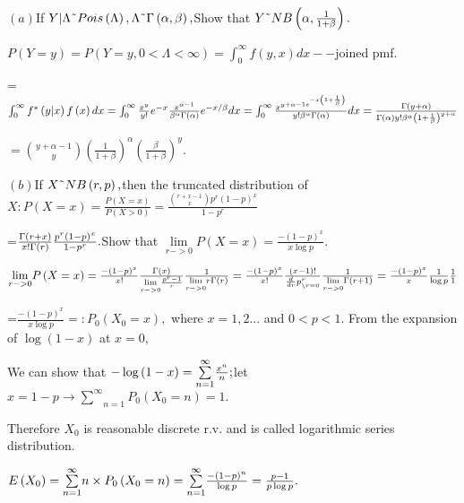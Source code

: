 \documentclass{article}
\begin{document}
$\left( a\right) $If $Y|\Lambda \symbol{126}Pois\left( \Lambda \right)
,\Lambda \symbol{126}\Gamma \left( \alpha ,\beta \right) ,$Show that $Y%
\symbol{126}NB\left( \alpha ,\frac{1}{1+\beta }\right) .$

$P\left( Y=y\right) =P\left( Y=y,0<\Lambda <\infty \right) =\int_{0}^{\infty
}f\left( y,x\right) dx--$joined pmf.

=$\int_{0}^{\infty }f^{\ast }\left( y|x\right) f\left( x\right)
dx=\int_{0}^{\infty }\frac{x^{y}}{y!}e^{-x}\frac{x^{\alpha -1}}{\beta
^{\alpha }\Gamma \left( \alpha \right) }e^{-x/\beta }dx=\int_{0}^{\infty }%
\frac{x^{y+\alpha -1e^{-x\left( 1+\frac{1}{\beta }\right) }}}{y!\beta
^{\alpha }\Gamma \left( \alpha \right) }dx=\frac{\Gamma \left( y+\alpha
\right) }{\Gamma \left( \alpha \right) y!\beta ^{\alpha }\left( 1+\frac{1}{%
\beta }\right) ^{y+\alpha }}$

$=\binom{y+\alpha -1}{y}\left( \frac{1}{1+\beta }\right) ^{\alpha }\left( 
\frac{\beta }{1+\beta }\right) ^{y}.$

\bigskip $\left( b\right) $If $X\symbol{126}NB\left( r,p\right) ,$then the
truncated distribution of $X:P(X=x)=\frac{P(X=x)}{P(X>0)}=\frac{\binom{r+x-1%
}{x}p^{r}\left( 1-p\right) ^{x}}{1-p^{r}}$

=$\frac{\Gamma \left( r+x\right) }{x!\Gamma \left( r\right) }\frac{%
p^{r}\left( 1-p\right) ^{x}}{1-p^{r}}.$Show that $\underset{r->0}{\lim }%
P\left( X=x\right) =\frac{-\left( 1-p\right) ^{x}}{x\log p}.$

$\underset{r->0}{\lim }P\left( X=x\right) =\frac{-\left( 1-p\right) ^{x}}{x!}%
\frac{\Gamma \left( x\right) }{\underset{r->0}{\lim }\frac{p^{r}-1}{r}}\frac{%
1}{\underset{r->0}{\lim }r\Gamma \left( r\right) }=\frac{-\left( 1-p\right)
^{x}}{x!}\frac{\left( x-1\right) !}{\frac{d}{dr}p_{\backslash r=0}^{r}}\frac{%
1}{\underset{r->0}{\lim }\Gamma \left( r+1\right) }=\frac{-\left( 1-p\right)
^{x}}{x}\frac{1}{\log p}\frac{1}{1}$

=$\frac{-\left( 1-p\right) ^{x}}{x\log p}=:P_{0}\left( X_{0}=x\right) ,$%
where $x=1,2...$ and $0<p<1.$ From the expansion of $\log \left( 1-x\right) $
at $x=0,$

We can show that $-\log \left( 1-x\right) =\underset{n=1}{\overset{\infty }{%
\sum }}\frac{x^{n}}{n};$let $x=1-p\rightarrow \underset{n=1}{\overset{\infty 
}{\sum }}P_{0}\left( X_{0}=n\right) =1.$

Therefore $X_{0}$ is reasonable discrete r.v. and is called logarithmic
series distribution.

$E\left( X_{0}\right) =\overset{\infty }{\underset{n=1}{\sum }}n\times
P_{0}\left( X_{0}=n\right) =\overset{\infty }{\underset{n=1}{\sum }}\frac{%
-\left( 1-p\right) ^{n}}{\log p}=\frac{p-1}{p\log p}.$
\end{document}
